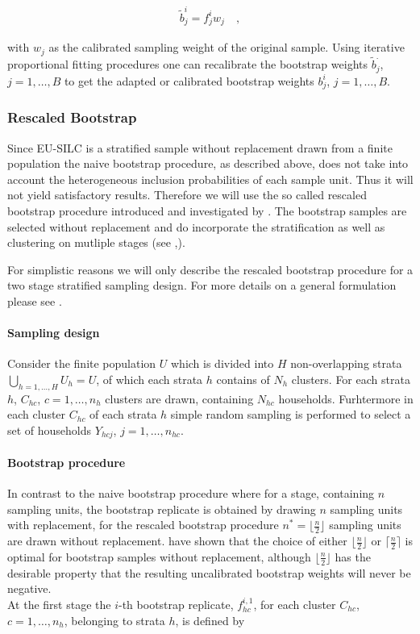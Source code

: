\documentclass{scrartcl}\usepackage[]{graphicx}\usepackage[]{color}
\begin{document}
\begin{align*}
  \tilde{b}_{j}^{i} = f_j^{i} w_j \quad,
\end{align*}

with $w_j$ as the calibrated sampling weight of the original sample.
Using iterative proportional fitting procedures one can recalibrate the bootstrap weights $\tilde{b}_{j}^{.}$, $j=1,\ldots,B$ to get the adapted or calibrated bootstrap weights $b_j^i$, $j=1,\ldots,B$.

\subsubsection{Rescaled Bootstrap}
Since EU-SILC is a stratified sample without replacement drawn from a finite population the naive bootstrap procedure, as described above, does not take into account the heterogeneous inclusion probabilities of each sample unit. Thus it will not yield satisfactory results. Therefore we will use the so called rescaled bootstrap procedure introduced and investigated by \citep{raowu1988}. The bootstrap samples are selected without replacement and do incorporate the stratification as well as clustering on mutliple stages (see \citep{chipprest2007},\citep{prest2009}).\\
\newline

For simplistic reasons we will only describe the rescaled bootstrap procedure for a two stage stratified sampling design. For more details on a general formulation please see \citep{prest2009}.

\paragraph{Sampling design}
Consider the finite population $U$ which is divided into $H$ non-overlapping strata $\bigcup\limits_{h=1,\ldots,H} U_h = U$, of which each strata $h$ contains of $N_h$ clusters. For each strata $h$, $C_{hc}$, $c=1,\ldots,n_h$ clusters are drawn, containing $N_{hc}$ households. Furhtermore in each cluster $C_{hc}$ of each strata $h$ simple random sampling is performed to select a set of households $Y_{hcj}$, $j=1,\ldots,n_{hc}$.

\paragraph{Bootstrap procedure}
In contrast to the naive bootstrap procedure where for a stage, containing $n$ sampling units, the bootstrap replicate is obtained by drawing $n$ sampling units with replacement, for the rescaled bootstrap procedure $n^*=\lfloor\frac{n}{2}\rfloor$ sampling units are drawn without replacement. \citep{chipprest2007} have shown that the choice of either $\lfloor\frac{n}{2}\rfloor$ or $\lceil\frac{n}{2}\rceil$ is optimal for bootstrap samples without replacement, although $\lfloor\frac{n}{2}\rfloor$ has the desirable property that the resulting uncalibrated bootstrap weights will never be negative.\\
\newline
At the first stage the $i$-th bootstrap replicate, $f^{i,1}_{hc}$, for each cluster $C_{hc}$,$c=1,\ldots,n_h$, belonging to strata $h$, is defined by
\end{document}
